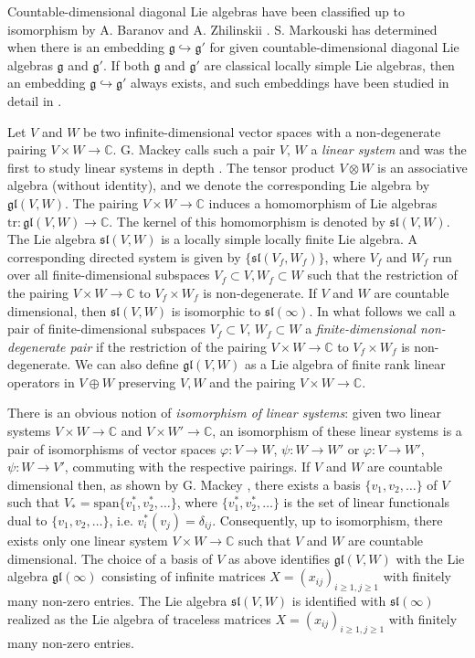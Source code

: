 \documentclass{svmult}
\newcommand {\CC} {\mathbb {C}}
\renewcommand{\sl}{\mathfrak{sl}}
\renewcommand{\gg}{\mathfrak{g}}
\renewcommand {\phi} {\varphi}
\renewcommand{\span}{\mathrm{span}}
\newcommand{\gl}{\mathfrak{gl}}
\begin{document}
Countable-dimensional diagonal Lie algebras have been classified up to
isomorphism by A. Baranov and A. Zhilinskii \cite{BZ}. S. Markouski
\cite{M} has determined when there is an embedding $\gg
\hookrightarrow \gg'$ for given countable-dimensional diagonal Lie
algebras $\gg$ and $\gg'$. If both $\gg$ and $\gg'$ are classical
locally simple Lie algebras, then an embedding 
$\gg \hookrightarrow \gg'$ always exists, and such embeddings have been studied in detail in \cite{dip2}.

Let $V$ and $W$ be two infinite-dimensional vector spaces with a non-degenerate pairing $V \times W \rightarrow \CC$. 
G. Mackey calls such a pair $V,\,W$ a \textit{linear system} and was the first to study linear systems in depth \cite{m}.
The tensor product $V\otimes W$ is an associative algebra (without
identity), and we denote the corresponding Lie algebra by 
$\gl(V,W)$.
The pairing $V\times W\to\CC$ induces a homomorphism of Lie algebras
$\mathrm{tr} : \gl(V,W)\to\CC$. The kernel of this homomorphism is
denoted by $\sl(V,W)$. The Lie algebra $\sl(V,W)$ is a locally simple
locally finite Lie algebra. A corresponding directed system is given
by $\{\sl(V_f,W_f)\}$, where $V_f$ and $W_f$ run over all
finite-dimensional subspaces $V_f\subset V, W_f\subset W$ such that
the restriction of the pairing $V \times W \rightarrow \CC$ to
$V_f\times W_f$ is non-degenerate. If $V$ and $W$ are countable
dimensional, then $\sl(V,W)$ is isomorphic to $\sl(\infty)$. In what
follows we call a pair of finite-dimensional subspaces $V_{f} \subset
V$, $W_{f} \subset W$ a \textit{finite-dimensional non-degenerate
  pair} if the restriction of the pairing $V \times W \rightarrow \CC$
to $V_{f} \times W_{f}$ is non-degenerate. We can also define 
$\gl(V,W)$ as a Lie algebra of finite rank linear operators in
$V\oplus W$ preserving $V,W$ and the pairing $V\times W\to\mathbb C$.

There is an obvious notion of \textit{isomorphism of linear systems}: given two linear systems $V \times W \rightarrow \CC$ and $V \times W' \rightarrow \CC$, an isomorphism of these linear systems is a pair of isomorphisms of vector spaces $\phi : V \rightarrow W$, $\psi: W\rightarrow W'$ or $\phi: V \rightarrow W'$, $\psi : W \rightarrow V'$, commuting with the respective pairings. If $V$ and $W$ are countable dimensional then, as shown by G. Mackey \cite{M}, there exists a basis $\lbrace
v_1,v_2,\dots\rbrace$ of $V$ such that 
$V_* = \span \lbrace v^*_1, v^*_2, \dots\rbrace$, 
where $\lbrace v^*_1, v^*_2, \dots\rbrace$ is the set of linear
functionals dual to $\lbrace v_1,v_2,\dots\rbrace$, i.e. $v_i^*(v_j) =
\delta_{ij}$. Consequently, up to isomorphism, there exists only one linear system $V \times W \rightarrow \CC$ such that $V$ and $W$ are countable dimensional. The choice of a basis of $V$ as above identifies $\gl(V,W)$ with
the Lie algebra $\gl(\infty)$ consisting of infinite matrices
$X=(x_{ij})_{i\geq 1,j\geq 1}$ with finitely many non-zero
entries. The Lie algebra $\sl(V,W)$ is identified with 
$\sl(\infty)$ realized as the Lie algebra of traceless matrices 
$X = (x_{ij})_{i \geq 1, j\geq 1}$ with finitely many non-zero entries. 
\end{document}
